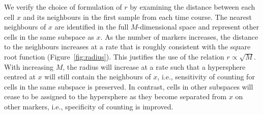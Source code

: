 \documentclass{article}
\begin{document}

%

We verify the choice of formulation of $r$ by examining the distance between each cell $x$ and its neighbours in the first sample from each time course.
The nearest neighbours of $x$ are identified in the full $M$-dimensional space and represent other cells in the same subspace as $x$.
As the number of markers increases, the distance to the neighbours increases at a rate that is roughly consistent with the square root function (Figure~\ref{fig:radius}).
This justifies the use of the relation $r\propto\sqrt{M}$.
With increasing $M$, the radius will increase at a rate such that a hypersphere centred at $x$ will still contain the neighbours of $x$, i.e., sensitivity of counting for cells in the same subspace is preserved.
In contrast, cells in other subspaces will cease to be assigned to the hypersphere as they become separated from $x$ on other markers, i.e., specificity of counting is improved.
   
\end{document}
